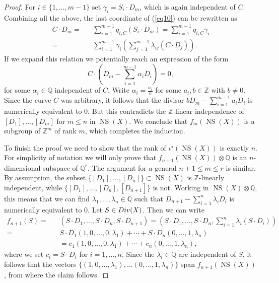 \documentclass[10pt,a4paper]{amsart}
\newcommand{\Div}{{\rm Div}}
\newcommand{\NS}{{\operatorname{NS}}}
\newcommand{\Q}{{\mathbb Q}}
\newcommand{\Z}{{\mathbb Z}}
\begin{document}
\begin{proof}
For $i\in\{1,\ldots, m-1\}$ set $\gamma_i=S_i\cdot D_m$, which is again independent of $C$. 
Combining all the above, the last coordinate of (\ref{eq10}) can be rewritten as 
\begin{eqnarray*}
 C\cdot D_m=&&\sum_{i=1}^{m-1} q_{i,C}(S_i\cdot D_m)=\sum_{i=1}^{m-1} q_{i,C}\gamma_i\\
 =&&\sum_{i=1}^{m-1}\gamma_i\left(\sum_{j=1}^{m-1}\lambda_{ij} (C\cdot D_j)\right).
\end{eqnarray*}
If we expand this relation we potentially reach an expression of the form
\[C\cdot\left(D_m-\sum_{i=1}^{m-1}\alpha_i D_i\right)=0,\] for some $\alpha_i\in\Q$ independent of $C$. Write $\alpha_i=\frac{a_i}{b}$ for some $a_i, b\in\Z$ with $b\neq 0$. Since the curve $C$ was arbitrary, it follows that the divisor $\displaystyle bD_m-\sum_{i=1}^{m-1}a_i D_i$ is numerically equivalent to $0$. But this contradicts the $\Z$-linear independence of $[D_1],\ldots, [D_m]$ for $m\leq n$ in $\NS(X)$. We conclude that $f_m(\NS(X))$ is a subgroup of $\Z^m$ of rank $m$, which completes the induction.




To finish the proof we need to show that the rank of $\iota^\star(\NS(X))$ is exactly $n$. For simplicity of notation we will only prove that $f_{n+1}(\NS(X))\otimes\Q$ is an $n$-dimensional subspace of $\Q^{r}$. The argument for a general $n+1\leq m\leq r$ is similar. By assumption, the subset $\{[D_1],\ldots, [D_n]\}\subset\NS(X)$ is $\Z$-linearly independent, while $\{[D_1],\ldots, [D_n], [D_{n+1}]\}$ is not. Working in $\NS(X)\otimes\Q$, this means that we can find $\lambda_1,\ldots, \lambda_n\in\Q$ such that $\displaystyle D_{n+1}-\sum_{i=1}^n \lambda_i D_i$ is numerically equivalent to $0$. Let $S\in\Div(X)$.  Then we can write
\begin{eqnarray*}
    f_{n+1}(S)=&&(S\cdot D_1,\ldots, S\cdot D_n, S\cdot D_{n+1})=\left(S\cdot D_1,\ldots, S\cdot D_n, \sum_{i=1}^n \lambda_i (S\cdot D_{i})\right)\\
    =&& S\cdot D_1(1,0,\ldots, 0, \lambda_1)+\cdots + S\cdot D_n (0,\ldots, 1, \lambda_n)\\
    &&=c_1(1,0,\ldots, 0, \lambda_1)+\cdots+c_n(0,\ldots, 1, \lambda_n),
\end{eqnarray*} where we set $c_i=S\cdot D_i$ for $i=1,\ldots, n$. Since the $\lambda_i\in\Q$ are independent of $S$, it follows that the vectors $\{(1,0,\ldots, \lambda_1),\ldots (0,\ldots, 1, \lambda_n)\}$ span $f_{n+1}(\NS(X))$, from where the claim follows. 




\end{proof}
\end{document}
